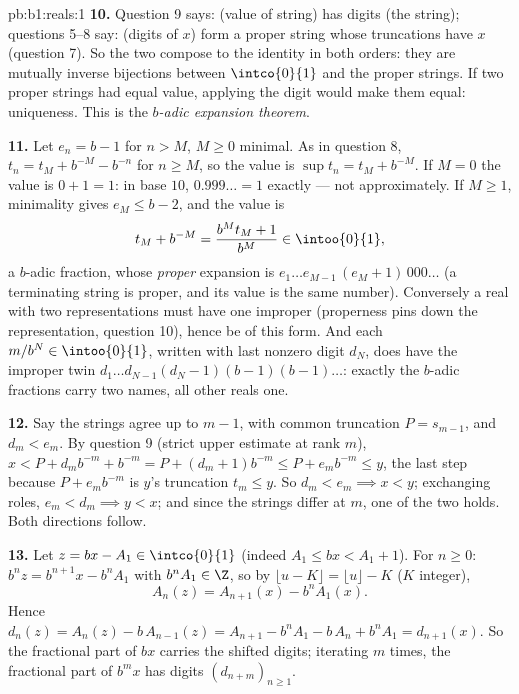 \begin{solution}{pb:b1:reals:1}
\textbf{10.} Question 9 says: (value of string) has digits (the
string); questions 5--8 say: (digits of $x$) form a proper string
whose truncations have  $x$ (question 7). So the two 
compose to the identity in both orders: they are mutually inverse
bijections between $\intco{0}{1}$ and the proper strings. If two
proper strings had equal value, applying the digit  would make
them equal: uniqueness. This is the \emph{$b$-adic expansion
theorem}.

\textbf{11.} Let $e_n = b - 1$ for $n > M$, $M \geq 0$ minimal.
As in question 8, $t_n = t_M + b^{-M} - b^{-n}$ for $n \geq M$,
so the value is $\sup t_n = t_M + b^{-M}$. If $M = 0$ the value
is $0 + 1 = 1$: in base $10$, $0.999\dots = 1$ exactly --- not
approximately. If $M \geq 1$, minimality gives $e_M \leq b - 2$,
and the value is
\[
t_M + b^{-M} = \frac{b^M t_M + 1}{b^M} \in \intoo{0}{1},
\]
a $b$-adic fraction, whose \emph{proper} expansion is $e_1 \dots
e_{M-1}\,(e_M + 1)\,000\dots$ (a terminating string is proper,
and its value is the same number). Conversely a real with two
representations must have one improper (properness pins down the
representation, question 10), hence be of this form. And each
$m/b^N \in \intoo{0}{1}$, written with last nonzero digit $d_N$,
does have the improper twin $d_1 \dots d_{N-1}(d_N -
1)(b-1)(b-1)\dots$: exactly the $b$-adic fractions carry two
names, all other reals one.

\textbf{12.} Say the strings agree up to $m - 1$, with common
truncation $P = s_{m-1}$, and $d_m < e_m$. By question 9 (strict
upper estimate at rank $m$), $x < P + d_m b^{-m} + b^{-m} = P +
(d_m + 1)b^{-m} \leq P + e_m b^{-m} \leq y$, the last step
because $P + e_m b^{-m}$ is $y$'s truncation $t_m \leq y$. So
$d_m < e_m \implies x < y$; exchanging roles, $e_m < d_m \implies
y < x$; and since the strings differ at $m$, one of the two
holds. Both directions follow.

\textbf{13.} Let $z = bx - A_1 \in \intco{0}{1}$ (indeed $A_1
\leq bx < A_1 + 1$). For $n \geq 0$: $b^n z = b^{n+1} x - b^n
A_1$ with $b^n A_1 \in \Z$, so by $\lfloor u - K \rfloor =
\lfloor u \rfloor - K$ ($K$ integer),
\[
A_n(z) = A_{n+1}(x) - b^n A_1(x) .
\]
Hence $d_n(z) = A_n(z) - b\,A_{n-1}(z) = A_{n+1} - b^n A_1 -
b\,A_n + b^n A_1 = d_{n+1}(x)$. So the fractional part of $bx$
carries the shifted digits; iterating $m$ times, the fractional
part of $b^m x$ has digits $(d_{n+m})_{n \geq 1}$.


\end{solution}
